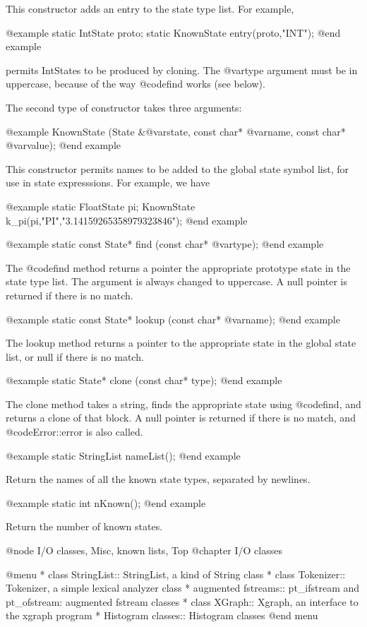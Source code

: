 This constructor adds an entry to the state type list.  For example,

@example
static IntState proto;
static KnownState entry(proto,"INT");
@end example

permits IntStates to be produced by cloning.  The @var{type} argument
must be in uppercase, because of the way @code{find} works (see below).

The second type of constructor takes three arguments:

@example
KnownState (State &@var{state}, const char* @var{name}, const char* @var{value});
@end example

This constructor permits names to be added to the global state symbol
list, for use in state expresssions.  For example, we have

@example
static FloatState pi;
KnownState k_pi(pi,"PI","3.14159265358979323846");
@end example

@example
static const State* find (const char* @var{type});
@end example

The @code{find} method returns a pointer the appropriate prototype
state in the state type list.  The argument is always changed to
uppercase.  A null pointer is returned if there is no match.

@example
static const State* lookup (const char* @var{name});
@end example

The lookup method returns a pointer to the appropriate state in
the global state list, or null if there is no match.

@example
static State* clone (const char* type);
@end example

The clone method takes a string, finds the appropriate state using
@code{find}, and returns a clone of that block.  A null pointer is
returned if there is no match, and @code{Error::error} is also called.

@example
static StringList nameList();
@end example

Return the names of all the known state types, separated by newlines.

@example
static int nKnown();
@end example

Return the number of known states.

@node I/O classes, Misc, known lists, Top
@chapter I/O classes

@menu
* class StringList::            StringList, a kind of String class
* class Tokenizer::             Tokenizer, a simple lexical analyzer class
* augmented fstreams::          pt_ifstream and pt_ofstream: augmented fstream classes
* class XGraph::                Xgraph, an interface to the xgraph program
* Histogram classes::           Histogram classes
@end menu

